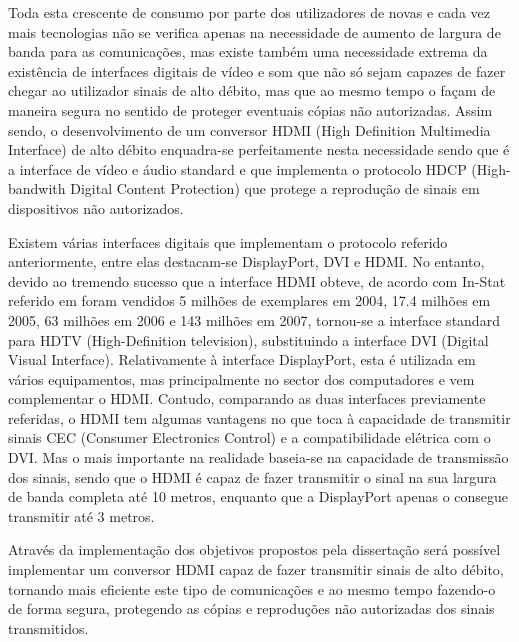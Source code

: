 Toda esta crescente de consumo por parte dos utilizadores de novas e cada vez mais tecnologias não se verifica apenas na necessidade de aumento de largura de banda para as comunicações, mas existe também uma necessidade extrema da existência de interfaces digitais de vídeo e som que não só sejam capazes de fazer chegar ao utilizador sinais de alto débito, mas que ao mesmo tempo o façam de maneira segura no sentido de proteger eventuais cópias não autorizadas. Assim sendo, o desenvolvimento de um conversor HDMI (High Definition Multimedia Interface) de alto débito enquadra-se perfeitamente nesta necessidade sendo que é a interface de vídeo e áudio standard e que implementa o protocolo HDCP (High-bandwith Digital Content Protection) que protege a reprodução de sinais em dispositivos não autorizados.

Existem várias interfaces digitais que implementam o protocolo referido anteriormente, entre elas destacam-se DisplayPort, DVI e HDMI. No entanto, devido ao tremendo sucesso que a interface HDMI obteve, de acordo com In-Stat referido em \cite{R002} foram vendidos 5 milhões de exemplares em 2004, 17.4 milhões em 2005, 63 milhões em 2006 e 143 milhões em 2007, tornou-se a interface standard para HDTV (High-Definition television), substituindo a interface DVI (Digital Visual Interface). Relativamente à interface DisplayPort, esta é utilizada em vários equipamentos, mas principalmente no sector dos computadores e vem complementar o HDMI. Contudo, comparando as duas interfaces previamente referidas, o HDMI tem algumas vantagens no que toca à capacidade de transmitir sinais CEC (Consumer Electronics Control) e a compatibilidade elétrica com o DVI. Mas o mais importante na realidade baseia-se na capacidade de transmissão dos sinais, sendo que o HDMI é capaz de fazer transmitir o sinal na sua largura de banda completa até 10 metros, enquanto que a DisplayPort apenas o consegue transmitir até 3 metros.

Através da implementação dos objetivos propostos pela dissertação será possível implementar um conversor HDMI capaz de fazer transmitir sinais de alto débito, tornando mais eficiente este tipo de comunicações e ao mesmo tempo fazendo-o de forma segura, protegendo as cópias e reproduções não autorizadas dos sinais transmitidos.
 


